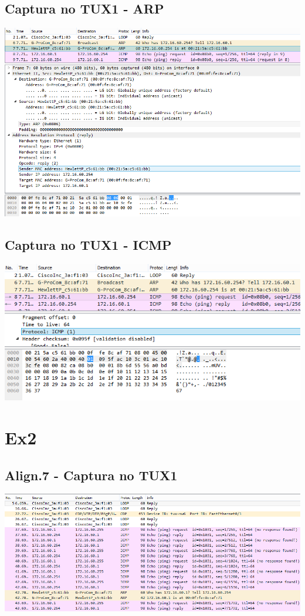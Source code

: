 \documentclass[11pt,a4paper,reqno]{report}
\numberwithin{equation}{section}
\begin{document}
\begin{appendices}
\subsection{Captura no TUX1 - ARP}
\includegraphics[width=18cm]{ex1_arp.png}
\subsection{Captura no TUX1 - ICMP}
\includegraphics[width=18cm]{ex1_icmp.png}

\section{Ex2}
\subsection{Align.7 - Captura no TUX1}
\includegraphics[width=18cm]{ex2_a7_tux1.png}

\end{appendices}
\end{document}
